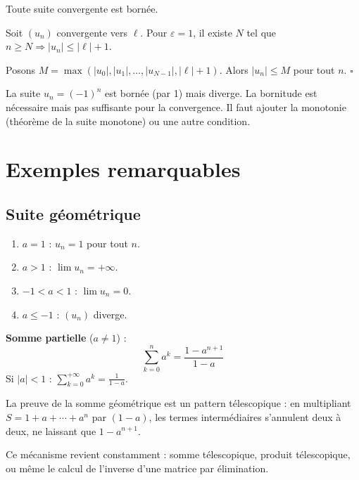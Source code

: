 \begin{propbox}
Toute suite convergente est bornée.
\end{propbox}

\begin{proofbox}
Soit $(u_n)$ convergente vers $\ell$. Pour $\varepsilon = 1$, il existe $N$ tel que $n \geqslant N \Rightarrow |u_n| \leqslant |\ell| + 1$.

Posons $M = \max(|u_0|, |u_1|, \ldots, |u_{N-1}|, |\ell| + 1)$. Alors $|u_n| \leqslant M$ pour tout $n$. \hfill$\square$
\end{proofbox}

\begin{intuitionbox}
La suite $u_n = (-1)^n$ est bornée (par 1) mais diverge. La bornitude est nécessaire mais pas suffisante pour la convergence. Il faut ajouter la monotonie (théorème de la suite monotone) ou une autre condition.
\end{intuitionbox}


\section{Exemples remarquables}

\subsection{Suite géométrique}

\begin{propbox}[--- Suite géométrique $u_n = a^n$]
\begin{enumerate}[leftmargin=1.5cm]
  \item $a = 1$ : $u_n = 1$ pour tout $n$.
  \item $a > 1$ : $\lim u_n = +\infty$.
  \item $-1 < a < 1$ : $\lim u_n = 0$.
  \item $a \leqslant -1$ : $(u_n)$ diverge.
\end{enumerate}

\textbf{Somme partielle} ($a \neq 1$) :
\[
  \sum_{k=0}^{n} a^k = \frac{1 - a^{n+1}}{1 - a}
\]
Si $|a| < 1$ : $\displaystyle\sum_{k=0}^{+\infty} a^k = \frac{1}{1-a}$.
\end{propbox}

\begin{intuitionbox}
La preuve de la somme géométrique est un pattern télescopique : en multipliant $S = 1 + a + \cdots + a^n$ par $(1-a)$, les termes intermédiaires s'annulent deux à deux, ne laissant que $1 - a^{n+1}$.

Ce mécanisme revient constamment : somme télescopique, produit télescopique, ou même le calcul de l'inverse d'une matrice par élimination.
\end{intuitionbox}

